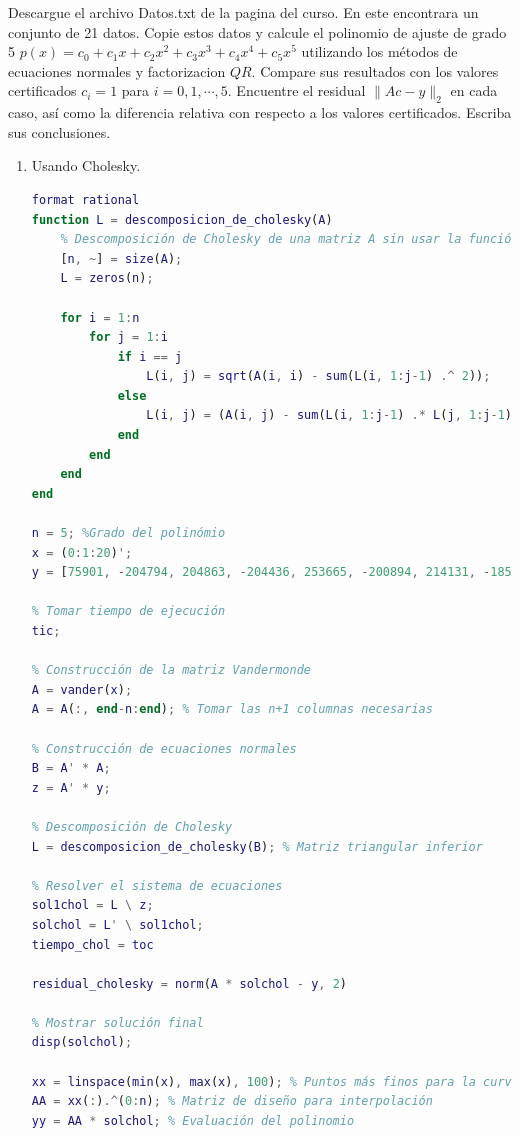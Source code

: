 \begin{homeworkProblem}
  Descargue el archivo Datos.txt de la pagina del curso. En este encontrara un conjunto de 21 datos. Copie estos datos y calcule el polinomio de ajuste de grado 5 $p(x)=c_0+c_1x+c_2x^2+c_3x^3+c_4x^4+c_5x^5$ utilizando los métodos de ecuaciones normales y factorizacion $QR$. Compare sus resultados con los valores certificados $c_i=1$ para $i=0,1,\cdots,5$. Encuentre el residual $\|Ac-y\|_2$ en cada caso, así como la diferencia relativa con respecto a los valores certificados. Escriba sus conclusiones.
  \begin{solucion}
    \begin{enumerate}
      \item Usando Cholesky.\\
        \begin{lstlisting}[language = matlab]
format rational
function L = descomposicion_de_cholesky(A)
    % Descomposición de Cholesky de una matriz A sin usar la función chol
    [n, ~] = size(A);
    L = zeros(n);
    
    for i = 1:n
        for j = 1:i
            if i == j
                L(i, j) = sqrt(A(i, i) - sum(L(i, 1:j-1) .^ 2));
            else
                L(i, j) = (A(i, j) - sum(L(i, 1:j-1) .* L(j, 1:j-1))) / L(j, j);
            end
        end
    end
end

n = 5; %Grado del polinómio
x = (0:1:20)';
y = [75901, -204794, 204863, -204436, 253665, -200894, 214131, -185192, 221249, -138370, 315911, -27644, 455253, 197434, 783995, 608816, 1370781, 1303798, 2205519, 2408860, 3444321]';

% Tomar tiempo de ejecución
tic;

% Construcción de la matriz Vandermonde
A = vander(x);
A = A(:, end-n:end); % Tomar las n+1 columnas necesarias

% Construcción de ecuaciones normales
B = A' * A;
z = A' * y;

% Descomposición de Cholesky
L = descomposicion_de_cholesky(B); % Matriz triangular inferior

% Resolver el sistema de ecuaciones
sol1chol = L \ z;      
solchol = L' \ sol1chol;
tiempo_chol = toc

residual_cholesky = norm(A * solchol - y, 2)

% Mostrar solución final
disp(solchol);

xx = linspace(min(x), max(x), 100); % Puntos más finos para la curva
AA = xx(:).^(0:n); % Matriz de diseño para interpolación
yy = AA * solchol; % Evaluación del polinomio


\end{lstlisting}
\end{enumerate}
\end{solucion}
\end{homeworkProblem}
